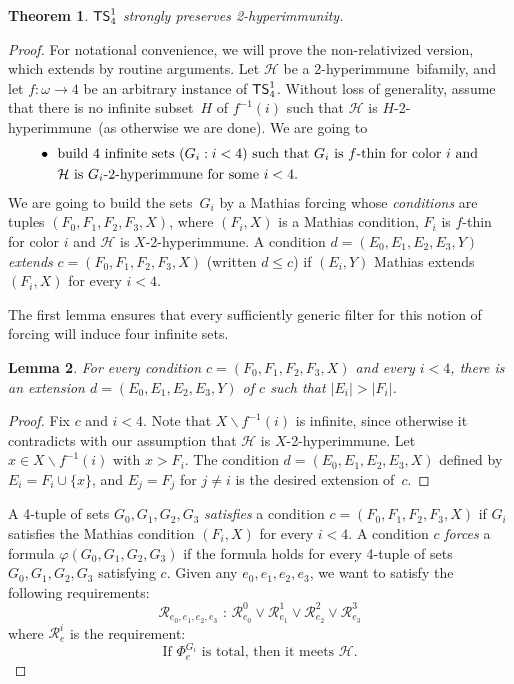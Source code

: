 \documentclass{amsart}
\newtheorem{theorem}{Theorem}[section]
\newtheorem{lemma}[theorem]{Lemma}
\theoremstyle{definition}
\theoremstyle{remark}
\numberwithin{equation}{section}
\theoremstyle{noparens}
\def\propertyL{2-hyperimmunity}
\def\hyper{2-hyperimmune}
\newcommand{\Hcal}{\mathcal{H}}
\newcommand{\Rcal}{\mathcal{R}}
\renewcommand{\setminus}{\smallsetminus}
\newcommand{\s}[1]{\ensuremath{\sf{#1}}}
\DeclareMathOperator{\ts}{\s{TS}}
\begin{document}
\begin{theorem}\label{thm:ts14-strong-preserve-double-immunity}
$\ts^1_4$ strongly preserves \propertyL.
\end{theorem}
\begin{proof}
For notational convenience, we will prove the non-relativized version,
 which extends by routine arguments.
Let $\Hcal$ be a \hyper\ bifamily, and let $f:\omega\rightarrow 4$ be an arbitrary instance of $\ts^1_4$.
Without loss of generality, assume that there is no infinite subset~$H$ of $f^{-1}(i)$
such that $\Hcal$ is $  H$-\hyper\ (as otherwise we are done).
We are going to
\begin{align}\nonumber
\bullet\ \ &\text{build 4 infinite sets $(G_i:i<4)$
such that $G_i$ is $f$-thin for color $i$
and}\\ \nonumber
&\text{$\Hcal$ is $  G_i$-\hyper\ for some $i < 4$.}
\end{align}
We are going to build the sets~$G_i$ by a Mathias forcing whose \emph{conditions}
are tuples $(F_0, F_1, F_2, F_3, X)$, where $(F_i,X) $ is a Mathias condition,
 $F_i$ is $f$-thin for color $i$
and $\Hcal$ is $ X$-\hyper.
A condition $d = (E_0, E_1, E_2, E_3, Y)$ \emph{extends} $c = (F_0, F_1, F_2, F_3, X)$ (written $d \leq c$)
if $(E_i, Y)$ Mathias extends $(F_i, X)$ for every $i < 4$.

The first lemma ensures that every sufficiently generic filter
for this notion of forcing will induce  four %
 infinite sets.

\begin{lemma}\label{lem:ts14-strong-preserve-double-immunity-force-R}
For every condition $c = (F_0, F_1, F_2, F_3, X)$ and every $i < 4$,
there is an extension $d = (E_0, E_1, E_2, E_3, Y)$ of $c$ such that
$|E_i| > |F_i|$.
\end{lemma}
\begin{proof}
Fix $c$ and $i < 4$. Note that $X \setminus f^{-1}(i)$ is infinite,
since otherwise it
contradicts with our assumption that $\Hcal$ is $  X$-\hyper.
Let $x \in X \setminus f^{-1}(i)$ with $x > F_i$.
The condition $d = (E_0, E_1, E_2,E_3, X  )$
defined by $E_i = F_i \cup \{x\}$, and $E_j = F_j$ for $j \neq i$
is the desired extension of~$c$.
\end{proof}

A 4-tuple of sets $G_0, G_1, G_2, G_3$ \emph{satisfies} a condition
$c = (F_0, F_1, F_2, F_3, X)$ if $G_i$ satisfies the Mathias condition $(F_i, X)$
for every $i < 4$. A condition $c$ \emph{forces} a formula $\varphi(G_0, G_1, G_2, G_3)$
if the formula holds for every 4-tuple of sets $G_0, G_1, G_2, G_3$ satisfying $c$.
Given any $e_0, e_1, e_2, e_3$, we want to satisfy the following requirements:
$$
\Rcal_{e_0, e_1, e_2, e_3} \mbox{ : } \Rcal^0_{e_0} \vee \Rcal^1_{e_1} \vee \Rcal^2_{e_2} \vee \Rcal^3_{e_3}
$$
where $\Rcal^i_e$ is the requirement:
$$
\text{If $\Phi_e^{G_i}$ is total, then it meets $\Hcal$.}$$


\end{proof}
\end{document}

